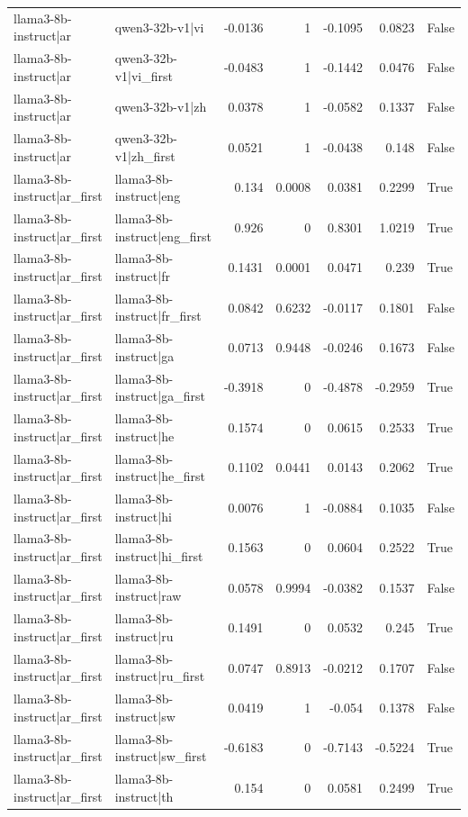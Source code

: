 \begin{table}
\begin{tabular}{l l r r r r l}
llama3-8b-instruct|ar & qwen3-32b-v1|vi & -0.0136 & 1 & -0.1095 & 0.0823 & False \\
llama3-8b-instruct|ar & qwen3-32b-v1|vi_first & -0.0483 & 1 & -0.1442 & 0.0476 & False \\
llama3-8b-instruct|ar & qwen3-32b-v1|zh & 0.0378 & 1 & -0.0582 & 0.1337 & False \\
llama3-8b-instruct|ar & qwen3-32b-v1|zh_first & 0.0521 & 1 & -0.0438 & 0.148 & False \\
llama3-8b-instruct|ar_first & llama3-8b-instruct|eng & 0.134 & 0.0008 & 0.0381 & 0.2299 & True \\
llama3-8b-instruct|ar_first & llama3-8b-instruct|eng_first & 0.926 & 0 & 0.8301 & 1.0219 & True \\
llama3-8b-instruct|ar_first & llama3-8b-instruct|fr & 0.1431 & 0.0001 & 0.0471 & 0.239 & True \\
llama3-8b-instruct|ar_first & llama3-8b-instruct|fr_first & 0.0842 & 0.6232 & -0.0117 & 0.1801 & False \\
llama3-8b-instruct|ar_first & llama3-8b-instruct|ga & 0.0713 & 0.9448 & -0.0246 & 0.1673 & False \\
llama3-8b-instruct|ar_first & llama3-8b-instruct|ga_first & -0.3918 & 0 & -0.4878 & -0.2959 & True \\
llama3-8b-instruct|ar_first & llama3-8b-instruct|he & 0.1574 & 0 & 0.0615 & 0.2533 & True \\
llama3-8b-instruct|ar_first & llama3-8b-instruct|he_first & 0.1102 & 0.0441 & 0.0143 & 0.2062 & True \\
llama3-8b-instruct|ar_first & llama3-8b-instruct|hi & 0.0076 & 1 & -0.0884 & 0.1035 & False \\
llama3-8b-instruct|ar_first & llama3-8b-instruct|hi_first & 0.1563 & 0 & 0.0604 & 0.2522 & True \\
llama3-8b-instruct|ar_first & llama3-8b-instruct|raw & 0.0578 & 0.9994 & -0.0382 & 0.1537 & False \\
llama3-8b-instruct|ar_first & llama3-8b-instruct|ru & 0.1491 & 0 & 0.0532 & 0.245 & True \\
llama3-8b-instruct|ar_first & llama3-8b-instruct|ru_first & 0.0747 & 0.8913 & -0.0212 & 0.1707 & False \\
llama3-8b-instruct|ar_first & llama3-8b-instruct|sw & 0.0419 & 1 & -0.054 & 0.1378 & False \\
llama3-8b-instruct|ar_first & llama3-8b-instruct|sw_first & -0.6183 & 0 & -0.7143 & -0.5224 & True \\
llama3-8b-instruct|ar_first & llama3-8b-instruct|th & 0.154 & 0 & 0.0581 & 0.2499 & True \\

\end{tabular}
\end{table}
